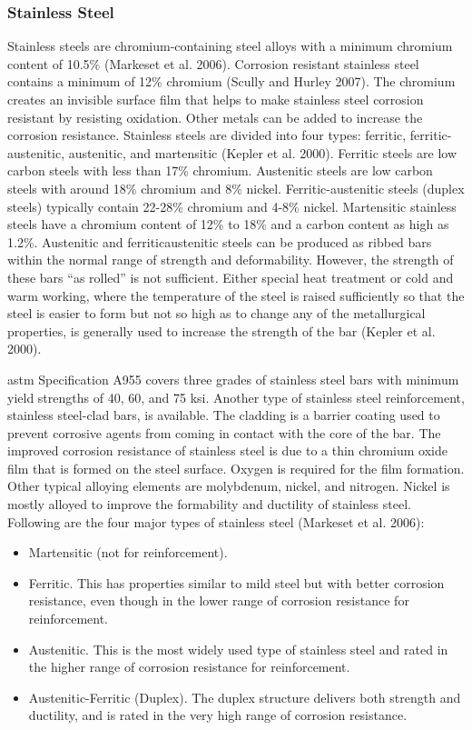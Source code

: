 \subsubsection{Stainless Steel}
Stainless steels are chromium-containing steel alloys with a minimum chromium content of 10.5\% (Markeset et al. 2006). Corrosion resistant stainless steel contains a minimum of 12\% chromium (Scully and Hurley 2007). The chromium creates an invisible surface film that helps to make stainless steel corrosion resistant by resisting oxidation. Other metals can be added to increase the corrosion resistance. Stainless steels are divided into four types: ferritic, ferritic-austenitic, austenitic, and martensitic (Kepler et al. 2000). Ferritic steels are low carbon steels with less than 17\% chromium. Austenitic steels are low carbon steels with around 18\% chromium and 8\% nickel.  Ferritic-austenitic steels (duplex steels) typically contain 22-28\% chromium and 4-8\% nickel. Martensitic stainless steels have a chromium content of 12\% to 18\% and a carbon content as high as 1.2\%. Austenitic and ferriticaustenitic steels can be produced as ribbed bars within the normal range of strength and deformability. However, the strength of these bars “as rolled” is not sufficient. Either special heat treatment or cold and warm working, where the temperature of the steel is raised sufficiently so that the steel is easier to form but not so high as to change any of the metallurgical properties, is generally used to increase the strength of the bar (Kepler et al. 2000).

\acrshort*{astm} Specification A955 covers three grades of stainless steel bars with minimum yield strengths of 40, 60, and 75 ksi. Another type of stainless steel reinforcement, stainless steel-clad bars, is available. The cladding is a barrier coating used to prevent corrosive agents from coming in contact with the core of the bar. The improved corrosion resistance of stainless steel is due to a thin chromium oxide film that is formed on the steel surface. Oxygen is required for the film formation. Other typical alloying elements are molybdenum, nickel, and nitrogen. Nickel is mostly alloyed to improve the formability and ductility of stainless steel. Following are the four major types of stainless steel (Markeset et al. 2006):

\begin{itemize}
  \item Martensitic (not for reinforcement).
  \item Ferritic. This has properties similar to mild steel but with better corrosion resistance, even though in the lower range of corrosion resistance for reinforcement.
  \item Austenitic. This is the most widely used type of stainless steel and rated in the higher range of corrosion resistance for reinforcement.
  \item Austenitic-Ferritic (Duplex). The duplex structure delivers both strength and ductility, and is rated in the very high range of corrosion resistance.
\end{itemize}

